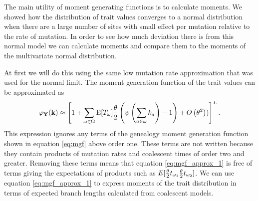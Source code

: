 The main utility of moment generating functions is to calculate moments. We
showed how the distribution of trait values converges to a normal distribution
when there are a large number of sites with small effect per mutation relative
to the rate of mutation. In order to see how much deviation there is from this
normal model we can calculate moments and compare them to the moments of the
multivariate normal distribution.

At first we will do this using the same low mutation rate approximation that was
used for the normal limit. The moment generation function of the trait values can 
be approximated as
\begin{equation}
  \label{eq:mgf_approx_1}
  \varphi_{\mathbf{Y}}(\mathbf{k}) \approx \left[ 1 + \sum_{\omega \in \Omega}
  \mathrm{E}[T_\omega] \frac{\theta}{2} \left( \psi\left( \sum_{a \in \omega} k_a\right) -1 \right) +
  O\left( \theta^2 \right))\right]^L.
\end{equation}
This expression ignores any terms of the genealogy moment generation function
shown in equation \ref{eq:mgf} above order one. These terms are not written
because they contain products of mutation rates and coalescent times of order
two and greater. Removing these terms means that equation \ref{eq:mgf_approx_1}
is free of terms giving the expectations of products such as $E[\frac{\theta}{2} t_{\omega_1}
  \frac{\theta}{2} t_{\omega_2}]$. We can use equation \eqref{eq:mgf_approx_1} to express
moments of the trait distribution in terms of expected branch lengths calculated
from coalescent models.
